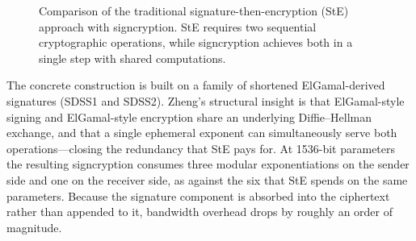 \documentclass[conference]{IEEEtran}
\begin{document}
\begin{figure}[t]
\centering
{}
\caption{Comparison of the traditional signature-then-encryption (StE) approach with signcryption. StE requires two sequential cryptographic operations, while signcryption achieves both in a single step with shared computations.}
\label{fig:ste_vs_sc}
\end{figure}

The concrete construction is built on a family of shortened ElGamal-derived signatures (SDSS1 and SDSS2). Zheng's structural insight is that ElGamal-style signing and ElGamal-style encryption share an underlying Diffie--Hellman exchange, and that a single ephemeral exponent can simultaneously serve both operations---closing the redundancy that StE pays for. At 1536-bit parameters the resulting signcryption consumes three modular exponentiations on the sender side and one on the receiver side, as against the six that StE spends on the same parameters. Because the signature component is absorbed into the ciphertext rather than appended to it, bandwidth overhead drops by roughly an order of magnitude.
\end{document}
